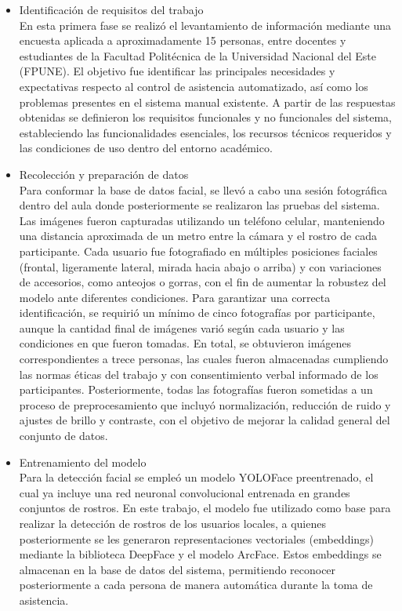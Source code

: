 \begin{itemize}
  \item Identificación de requisitos del trabajo \\
  En esta primera fase se realizó el levantamiento de información mediante una encuesta aplicada a aproximadamente 15 personas, entre docentes y estudiantes de la Facultad Politécnica de la Universidad Nacional del Este (FPUNE). El objetivo fue identificar las principales necesidades y expectativas respecto al control de asistencia automatizado, así como los problemas presentes en el sistema manual existente.  
  A partir de las respuestas obtenidas se definieron los requisitos funcionales y no funcionales del sistema, estableciendo las funcionalidades esenciales, los recursos técnicos requeridos y las condiciones de uso dentro del entorno académico.

  \item Recolección y preparación de datos \\
  Para conformar la base de datos facial, se llevó a cabo una sesión fotográfica dentro del aula donde posteriormente se realizaron las pruebas del sistema.  
  Las imágenes fueron capturadas utilizando un teléfono celular, manteniendo una distancia aproximada de un metro entre la cámara y el rostro de cada participante.  
  Cada usuario fue fotografiado en múltiples posiciones faciales (frontal, ligeramente lateral, mirada hacia abajo o arriba) y con variaciones de accesorios, como anteojos o gorras, con el fin de aumentar la robustez del modelo ante diferentes condiciones.  
  Para garantizar una correcta identificación, se requirió un mínimo de cinco fotografías por participante, aunque la cantidad final de imágenes varió según cada usuario y las condiciones en que fueron tomadas.  
  En total, se obtuvieron imágenes correspondientes a trece personas, las cuales fueron almacenadas cumpliendo las normas éticas del trabajo y con consentimiento verbal informado de los participantes.
  Posteriormente, todas las fotografías fueron sometidas a un proceso de preprocesamiento que incluyó normalización, reducción de ruido y ajustes de brillo y contraste, con el objetivo de mejorar la calidad general del conjunto de datos.

  \item Entrenamiento del modelo \\
  Para la detección facial se empleó un modelo YOLOFace preentrenado, el cual ya incluye una red neuronal convolucional entrenada en grandes conjuntos de rostros.  
  En este trabajo, el modelo fue utilizado como base para realizar la detección de rostros de los usuarios locales, a quienes posteriormente se les generaron representaciones vectoriales (embeddings) mediante la biblioteca DeepFace y el modelo ArcFace.  
  Estos embeddings se almacenan en la base de datos del sistema, permitiendo reconocer posteriormente a cada persona de manera automática durante la toma de asistencia.


\end{itemize}
